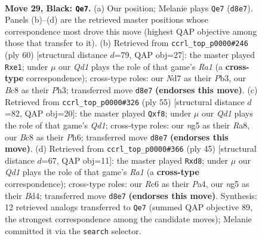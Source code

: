\documentclass[11pt]{article}
\begin{document}
\clearpage

\begin{figure}[p]\centering
\begin{subfigure}{0.46\textwidth}\centering
\resizebox{\linewidth}{!}{%
\newchessgame
\chessboard[
  setfen={2bq1k2/P1pn1p1p/2r5/3p2N1/1Q3P2/8/2P3P1/R4RK1 b - - 2 29},
  showmover=false,
  pgfstyle=straightmove, color=movearrow, markmove={d8-e7}
]}
\caption{}
\end{subfigure}\hfill
\begin{subfigure}{0.46\textwidth}\centering
\resizebox{\linewidth}{!}{%
\newchessgame
\chessboard[
  setfen={6k1/6pp/2q1p3/p1r2r2/4R3/1P2Q2P/P5P1/R3n1K1 w - - 0 31},
  showmover=false,
  pgfstyle=straightmove, color=movearrow, markmove={a1-e1}
]}
\caption{}
\end{subfigure}
\\[4pt]
\begin{subfigure}{0.46\textwidth}\centering
\resizebox{\linewidth}{!}{%
\newchessgame
\chessboard[
  setfen={r2q1Qk1/1p4p1/7p/p2np3/P1NP4/8/1P4PP/R4R1K b - - 0 28},
  showmover=false,
  pgfstyle=straightmove, color=movearrow, markmove={d8-f8}
]}
\caption{}
\end{subfigure}\hfill
\begin{subfigure}{0.46\textwidth}\centering
\resizebox{\linewidth}{!}{%
\newchessgame
\chessboard[
  setfen={r2N2k1/1p2p2p/6p1/8/p2bP3/7Q/q4PPP/2R2RK1 b - - 0 23},
  showmover=false,
  pgfstyle=straightmove, color=movearrow, markmove={a8-d8}
]}
\caption{}
\end{subfigure}
\caption{\textbf{Move 29, Black: \texttt{Qe7}.} (a) Our position; Melanie plays \texttt{Qe7} (\texttt{d8e7}). Panels (b)--(d) are the retrieved master positions whose correspondence most drove this move (highest QAP objective among those that transfer to it). (b) Retrieved from \texttt{ccrl\_top\_p0000\#246} (ply 60) [structural distance $d$=79, QAP obj=27]: the master played \texttt{Rxe1}; under $\mu$ our \emph{Qd1} plays the role of that game's \emph{Ra1} (a \textbf{cross-type} correspondence); cross-type roles: our \emph{N}d7 as their \emph{P}b3, our \emph{B}c8 as their \emph{P}h3; transferred move \texttt{d8e7} \textbf{(endorses this move)}. (c) Retrieved from \texttt{ccrl\_top\_p0000\#326} (ply 55) [structural distance $d$=82, QAP obj=20]: the master played \texttt{Qxf8}; under $\mu$ our \emph{Qd1} plays the role of that game's \emph{Qd1}; cross-type roles: our \emph{n}g5 as their \emph{R}a8, our \emph{B}c8 as their \emph{P}h6; transferred move \texttt{d8e7} \textbf{(endorses this move)}. (d) Retrieved from \texttt{ccrl\_top\_p0000\#366} (ply 45) [structural distance $d$=67, QAP obj=11]: the master played \texttt{Rxd8}; under $\mu$ our \emph{Qd1} plays the role of that game's \emph{Ra1} (a \textbf{cross-type} correspondence); cross-type roles: our \emph{R}c6 as their \emph{P}a4, our \emph{n}g5 as their \emph{B}d4; transferred move \texttt{d8e7} \textbf{(endorses this move)}. Synthesis: 12 retrieved analogs transferred to \texttt{Qe7} (summed QAP objective 89, the strongest correspondence among the candidate moves); Melanie committed it via the \texttt{search} selector.}
\label{fig:thought-m57}
\end{figure}
\end{document}
